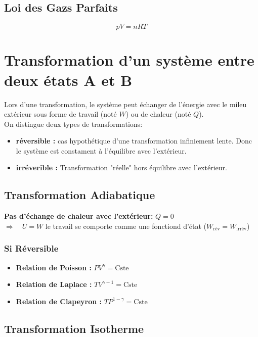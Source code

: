 \documentclass[a4paper,12pt]{article}
\newcommand{\re}{\textrm}
\begin{document}
\subsection{Loi des Gazs Parfaits}
$$ \boxed{pV = nRT} $$



\section{Transformation d'un système entre deux états A et B}

Lors d'une transformation, le système peut échanger de l'énergie avec le mileu extérieur
sous forme de travail (noté $W$) ou de chaleur (noté $Q$).\\
On distingue deux types de transformations:
\begin{itemize}
    \item \textbf{réversible :} cas hypothétique d'une transformation infiniement lente. Donc le système est constament à l'équilibre avec l'extérieur.
    \item \textbf{irréverible :} Transformation "réelle" hors équilibre avec l'extérieur.
\end{itemize}



\subsection{Transformation Adiabatique}

\textbf{Pas d'échange de chaleur avec l'extérieur:} $\boxed{Q = 0}$\\ 
$\Longrightarrow \quad U = W$ \quad le travail se comporte comme une fonctiond d'état ($W_{\text{rév}} = W_{\text{irrév}}$)

\subsubsection{Si Réversible}

\begin{itemize}[label=\textbullet]
    \item \textbf{Relation de Poisson :} $PV^\gamma = \re{Cste}$
    \item \textbf{Relation de Laplace :} $T V^{\gamma - 1} = \re{Cste}$
    \item \textbf{Relation de Clapeyron :} $T P^{1 - \gamma} = \re{Cste}$
\end{itemize}

\subsection{Transformation Isotherme}
\end{document}
